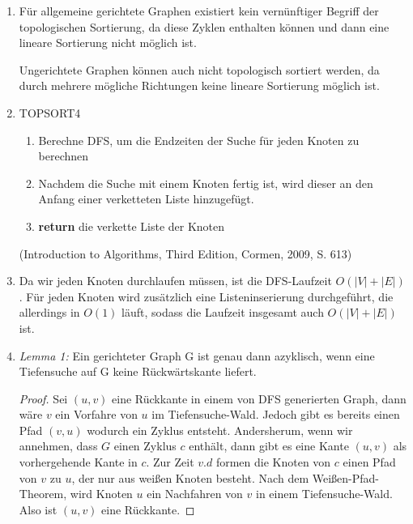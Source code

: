 \documentclass[ngerman,landscape,twocolumn]{adtexsheet}
\begin{document}
\begin{solution}
    \begin{enumerate}
    
        \item Für allgemeine gerichtete Graphen existiert kein vernünftiger Begriff der topologischen Sortierung, da diese Zyklen enthalten können und dann eine lineare Sortierung nicht möglich ist.
            
            Ungerichtete Graphen können auch nicht topologisch sortiert werden, da durch mehrere mögliche Richtungen keine lineare Sortierung möglich ist.
    
        \item TOPSORT4
    \begin{enumerate}
        \item Berechne DFS, um die Endzeiten der Suche für jeden Knoten zu berechnen
        \item Nachdem die Suche mit einem Knoten fertig ist, wird dieser an den Anfang einer verketteten Liste hinzugefügt.
        \item \textbf{return} die verkette Liste der Knoten
    \end{enumerate}
        
        (Introduction to Algorithms, Third Edition, Cormen, 2009, S. 613)
    
        \item Da wir jeden Knoten durchlaufen müssen, ist die DFS-Laufzeit $O(|V| + |E|)$. Für jeden Knoten wird zusätzlich eine Listeninserierung durchgeführt, die allerdings in $O(1)$ läuft, sodass die Laufzeit insgesamt auch $O(|V| + |E|)$ ist.

        \item
        
        \emph{Lemma 1:} Ein gerichteter Graph G ist genau dann azyklisch, wenn eine Tiefensuche auf G keine Rückwärtskante liefert.
        \begin{proof}
        Sei $(u,v)$ eine Rückkante in einem von DFS generierten Graph, dann wäre $v$ ein Vorfahre von $u$ im Tiefensuche-Wald. Jedoch gibt es bereits einen Pfad $(v,u)$ wodurch ein Zyklus entsteht.
        Andersherum, wenn wir annehmen, dass $G$ einen Zyklus $c$ enthält, dann gibt es eine Kante $(u,v)$ als vorhergehende Kante in $c$. Zur Zeit $v.d$ formen die Knoten von $c$ einen Pfad von $v$ zu $u$, der nur aus weißen Knoten besteht. Nach dem Weißen-Pfad-Theorem, wird Knoten $u$ ein Nachfahren von $v$ in einem Tiefensuche-Wald. Also ist $(u,v)$ eine Rückkante.
        \end{proof}
        

\end{enumerate}
\end{solution}
\end{document}
